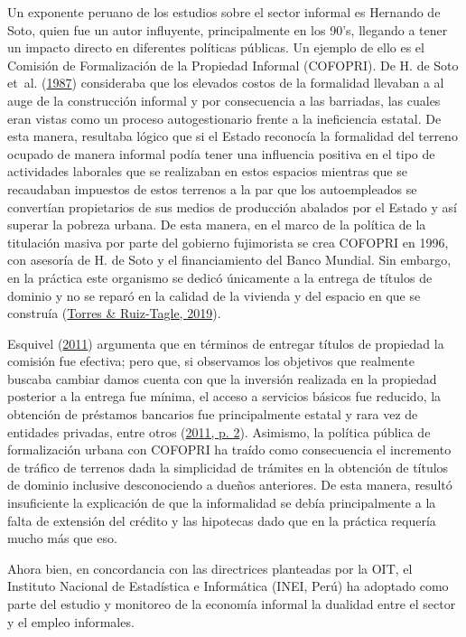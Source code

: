 \documentclass[
  letterpaper,
  12pt,
  oneside,
  spanish,
  doublespacing,
  headsepline,
  parskip]{MastersDoctoralThesis}
\begin{document}
Un exponente peruano de los estudios sobre el sector informal es
Hernando de Soto, quien fue un autor influyente, principalmente en los
90's, llegando a tener un impacto directo en diferentes políticas
públicas. Un ejemplo de ello es el Comisión de Formalización de la
Propiedad Informal (COFOPRI). De H. de Soto et~al.
(\protect\hyperlink{ref-desoto1987}{1987}) consideraba que los elevados
costos de la formalidad llevaban a al auge de la construcción informal y
por consecuencia a las barriadas, las cuales eran vistas como un proceso
autogestionario frente a la ineficiencia estatal. De esta manera,
resultaba lógico que si el Estado reconocía la formalidad del terreno
ocupado de manera informal podía tener una influencia positiva en el
tipo de actividades laborales que se realizaban en estos espacios
mientras que se recaudaban impuestos de estos terrenos a la par que los
autoempleados se convertían propietarios de sus medios de producción
abalados por el Estado y así superar la pobreza urbana. De esta manera,
en el marco de la política de la titulación masiva por parte del
gobierno fujimorista se crea COFOPRI en 1996, con asesoría de H. de Soto
y el financiamiento del Banco Mundial. Sin embargo, en la práctica este
organismo se dedicó únicamente a la entrega de títulos de dominio y no
se reparó en la calidad de la vivienda y del espacio en que se construía
(\protect\hyperlink{ref-torres2019}{Torres \& Ruiz-Tagle, 2019}).

Esquivel (\protect\hyperlink{ref-esquivel2011}{2011}) argumenta que en
términos de entregar títulos de propiedad la comisión fue efectiva; pero
que, si observamos los objetivos que realmente buscaba cambiar damos
cuenta con que la inversión realizada en la propiedad posterior a la
entrega fue mínima, el acceso a servicios básicos fue reducido, la
obtención de préstamos bancarios fue principalmente estatal y rara vez
de entidades privadas, entre otros
(\protect\hyperlink{ref-esquivel2011}{2011, p. 2}). Asimismo, la
política pública de formalización urbana con COFOPRI ha traído como
consecuencia el incremento de tráfico de terrenos dada la simplicidad de
trámites en la obtención de títulos de dominio inclusive desconociendo a
dueños anteriores. De esta manera, resultó insuficiente la explicación
de que la informalidad se debía principalmente a la falta de extensión
del crédito y las hipotecas dado que en la práctica requería mucho más
que eso.

Ahora bien, en concordancia con las directrices planteadas por la OIT,
el Instituto Nacional de Estadística e Informática (INEI, Perú) ha
adoptado como parte del estudio y monitoreo de la economía informal la
dualidad entre el sector y el empleo informales.
\end{document}
